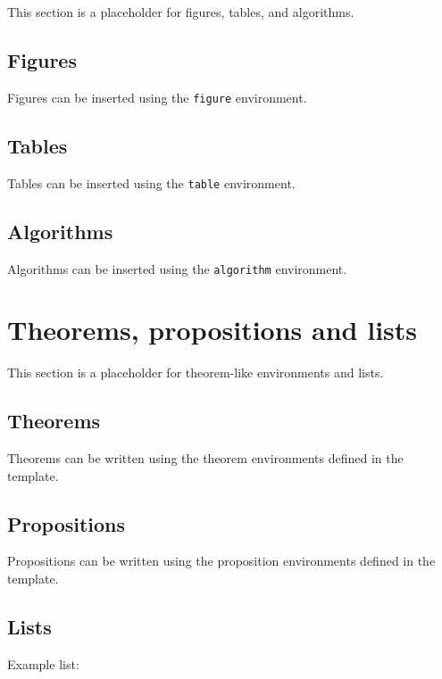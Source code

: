 This section is a placeholder for figures, tables, and algorithms.

\subsection{Figures}
\label{subsec:figures}

Figures can be inserted using the \verb|figure| environment.

\subsection{Tables}
\label{subsec:tables}

Tables can be inserted using the \verb|table| environment.

\subsection{Algorithms}
\label{subsec:algorithms}

Algorithms can be inserted using the \verb|algorithm| environment.

\section{Theorems, propositions and lists}
\label{sec:theorems_propositions_lists}

This section is a placeholder for theorem-like environments and lists.

\subsection{Theorems}
\label{subsec:theorems}

Theorems can be written using the theorem environments defined in the template.

\subsection{Propositions}
\label{subsec:propositions}

Propositions can be written using the proposition environments defined in the template.

\subsection{Lists}
\label{subsec:lists}

Example list:

